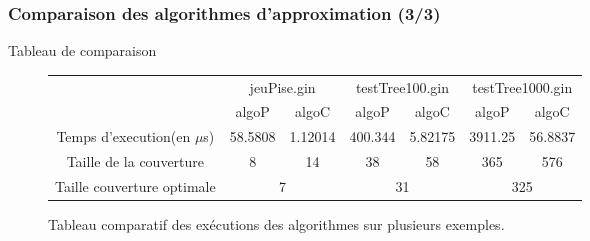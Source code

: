   \begin{frame}
   \frametitle{Comparaison des algorithmes d'approximation (3/3)}

   \begin{block}{Tableau de comparaison}
    \begin{figure}[!ht]
     \begin{center}
      \footnotesize
      \begin{tabular}{|c|c|c||c|c||c|c|}
       \cline{2-7}
       \multicolumn{1}{c|}{} & \multicolumn{2}{|c||}{jeuPise.gin}
       &\multicolumn{2}{|c||}{testTree100.gin} &
       \multicolumn{2}{|c|}{testTree1000.gin}\\ 
       \cline{2-7}
       \multicolumn{1}{c|}{} & algoP & algoC & algoP & algoC & algoP &
       algoC\\
       \hline
       Temps d'execution(en $\mu$s) & 58.5808 & 1.12014 & 400.344 &
       5.82175 & 3911.25 & 56.8837\\
       \hline
       Taille de la couverture & 8 & 14 & 38 & 58 & 365 & 576\\
       \hline
       \hline
       Taille couverture optimale & \multicolumn{2}{|c||}{7} &
		   \multicolumn{2}{|c||}{31} &
       \multicolumn{2}{|c|}{325}\\ 
       \hline
      \end{tabular}
      \caption{Tableau comparatif des exécutions des algorithmes sur
      plusieurs exemples.\label{tableau}} 
     \end{center}
    \end{figure}  
   \end{block}
  \end{frame}
